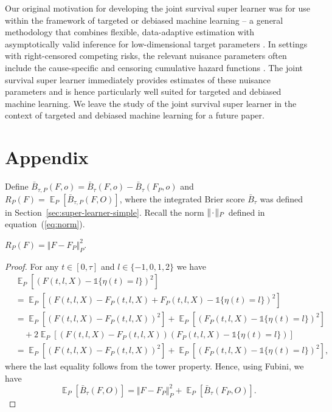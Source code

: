 \documentclass[lineno]{biometrika}
\DeclareMathOperator{\E}{\mathbb{E}} %
\newcommand{\blank}{\makebox[1ex]{\textbf{$\cdot$}}}
\newcommand{\1}{\mathds{1}}
\begin{document}
Our original motivation for developing the joint survival super
learner was for use within the framework of targeted or debiased
machine learning -- a general methodology that combines flexible,
data-adaptive estimation with asymptotically valid inference for
low-dimensional target parameters
\citep{van2011targeted,chernozhukov2018double}. In settings with
right-censored competing risks, the relevant nuisance parameters often
include the cause-specific and censoring cumulative hazard functions
\citep[e.g.,][]{van2003unified,rytgaard2022targeted}. The joint
survival super learner immediately provides estimates of these
nuisance parameters and is hence particularly well suited for targeted
and debiased machine learning. We leave the study of the joint
survival super learner in the context of targeted and debiased machine
learning for a future paper.

\appendix

\section*{Appendix}


Define
\( \bar{B}_{\tau,P}(F, o) = \bar{B}_{\tau}(F, o) -
\bar{B}_{\tau}(F_P, o) \) and
\( R_{P}(F) = \E_P{[\bar{B}_{\tau,P}(F, O)]} \), where the
integrated Brier score \( \bar{B}_{\tau} \) was defined in
Section~\ref{sec:super-learner-simple}. Recall the norm
\( \Vert \blank \Vert_{P}\) defined in
equation~(\ref{eq:norm}).

\begin{lemma}
  \label{lemma:norm}
  \( R_{P}(F) = \Vert F - F_P \Vert_{P}^2 \).
\end{lemma}
\begin{proof}[Proof]
  For any \( t \in [0, \tau] \) and \( l\in \{-1,0,1,2\} \) we have
  \begin{align*}
    & \E_{P}{\left[ (F(t, l, X) - \1{\{\eta(t) = l \}})^2 \right]}
    \\
    & =    \E_{P}{\left[ (F(t, l, X) - F_P(t, l, X) + F_P(t, l, X) - \1{\{\eta(t) = l
      \}})^2 \right]}
    \\
    & =    \E_{P}{\left[ (F(t, l, X) - F_P(t, l, X))^2\right]}
      + \E_{P}{\left[ (F_P(t, l, X) - \1{\{\eta(t) = l \}})^2\right]}
    \\
    & \quad
      + 2\E_{P}{\left[ (F(t, l, X) - F_P(t, l, X))(F_P(t, l, X) - \1{\{\eta(t) = l
      \}})\right]}
    \\
    & =    \E_{P}{\left[ (F(t, l, X) - F_P(t, l, X))^2\right]}
      + \E_{P}{\left[ (F_P(t, l, X) - \1{\{\eta(t) = l \}})^2\right]},
  \end{align*}
  where the last equality follows from the tower property. Hence, using Fubini,
  we have
  \begin{equation*}
    \E_P{[\bar{B}_{\tau}(F, O)]}
    = \Vert F - F_P \Vert_{P}^2 + \E_P{[\bar{B}_{\tau}(F_P, O)]}.
  \end{equation*}
\end{proof}
\end{document}
